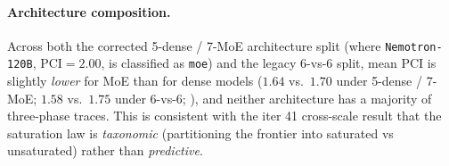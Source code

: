 \begin{table}[t]
  \centering
  \small
  \caption{\textbf{Top-6 traces by $|m_3|$.}  Only anchors with
    strong late-trace drift appear; low-$|m_3|$ traces are pushed off the top of the table.  $c_1$ and
    $c_2$ are the changepoints as a fraction of trace length.}
  \label{tab:iter65-top-slopes}
\end{table}

\paragraph{Architecture composition.}
Across both the corrected 5-dense / 7-MoE architecture split (where \texttt{Nemotron-120B}, $\mathrm{PCI}=2.00$, is classified as \texttt{moe}) and the legacy 6-vs-6 split, mean PCI is slightly \emph{lower} for MoE than for dense models ($1.64$ vs.\ $1.70$ under 5-dense / 7-MoE; $1.58$ vs.\ $1.75$ under 6-vs-6; ), and neither architecture has a
majority of three-phase traces.  This is consistent with the
iter 41 cross-scale result that the saturation law is
\emph{taxonomic} (partitioning the frontier into saturated vs
unsaturated) rather than \emph{predictive}.

